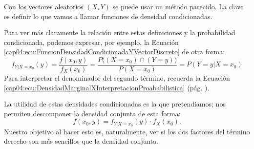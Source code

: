 Con los vectores aleatorios $(X,Y)$ se puede usar un método parecido. La clave es definir lo que vamos a llamar funciones de densidad condicionadas.
    \begin{center}
    \end{center}
Para ver más claramente la relación entre estas definiciones y la probabilidad condicionada, podemos expresar, por ejemplo,  la Ecuación \ref{cap04:ecu:FuncionDensidadCondicionadaYVectorDiscreto} de otra forma:
\[
f_{Y|X=x_0}(y)=\dfrac{f(x_0,y)}{f_X(x_0)}=
\dfrac{P\bigg((X=x_0)\cap(Y=y)\bigg)}{P(X=x_0)}= P(Y=y|X=x_0)
\]
Para interpretar el denominador del segundo término, recuerda la Ecuación \ref{cap04:ecu:DensidadMarginalXInterpretacionProababilistica} (pág. \pageref{cap04:ecu:DensidadMarginalXInterpretacionProababilistica}).

La utilidad de estas densidades condicionadas es la que pretendíamos; nos permiten descomponer la densidad conjunta de esta forma:
\[
f(x_0,y) = f_{Y|X=x_0}(y)\cdot f_X(x_0).
\]
Nuestro objetivo al hacer esto es, naturalmente, ver si los dos factores del término derecho son más sencillos que la densidad conjunta.

